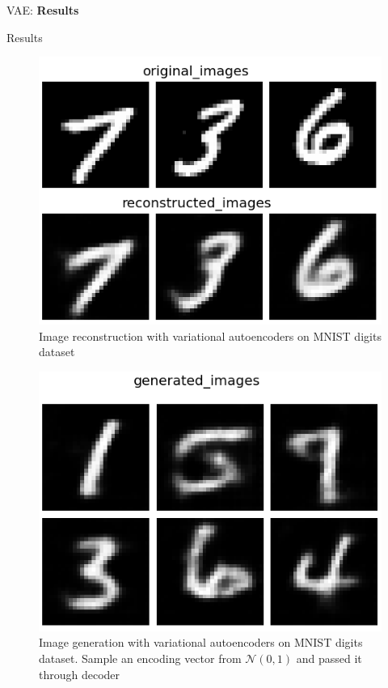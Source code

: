 \begin{frame}{}
	\LARGE VAE: \textbf{Results}
\end{frame}

\begin{frame}[allowframebreaks]{Results}
\begin{figure}
        \centering
        \includegraphics[height=0.8\textheight, width=\textwidth, keepaspectratio]{images/vae/result-mnist-1.png}
        \caption*{Image reconstruction with variational autoencoders on MNIST digits dataset}
\end{figure}

\framebreak
\begin{figure}
        \centering
        \includegraphics[height=0.8\textheight, width=\textwidth, keepaspectratio]{images/vae/result-mnist-2.png}
        \caption*{Image generation with variational autoencoders on MNIST digits dataset. Sample an encoding vector from $\mathcal{N}(0,1)$ and passed it through decoder}
\end{figure}


\end{frame}
